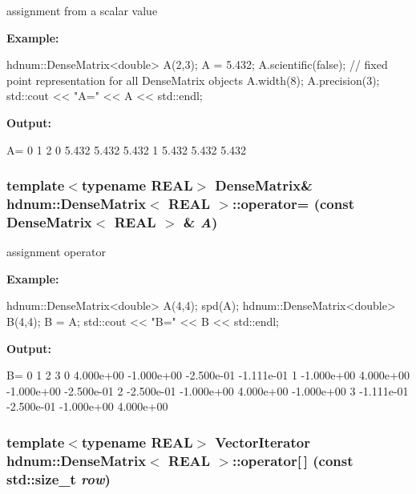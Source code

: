 assignment from a scalar value 

{\bfseries Example:} 
\begin{DoxyCode}
  hdnum::DenseMatrix<double> A(2,3);
  A = 5.432;
  A.scientific(false); // fixed point representation for all DenseMatrix objects
  A.width(8);
  A.precision(3);
  std::cout << "A=" << A << std::endl;
\end{DoxyCode}


{\bfseries Output:} \begin{DoxyVerb}
A=
                    0        1        2 
          0     5.432    5.432    5.432
          1     5.432    5.432    5.432
	  \end{DoxyVerb}
 \hypertarget{classhdnum_1_1DenseMatrix_a45a853bb1f130f7eed4590246b2b5cb5}{
\subsubsection[{operator=}]{\setlength{\rightskip}{0pt plus 5cm}template$<$typename REAL$>$ {\bf DenseMatrix}\& {\bf hdnum::DenseMatrix}$<$ REAL $>$::operator= (const {\bf DenseMatrix}$<$ REAL $>$ \& {\em A})}}
\label{classhdnum_1_1DenseMatrix_a45a853bb1f130f7eed4590246b2b5cb5}


assignment operator 

{\bfseries Example:} 
\begin{DoxyCode}
  hdnum::DenseMatrix<double> A(4,4);
  spd(A);
  hdnum::DenseMatrix<double> B(4,4);
  B = A;
  std::cout << "B=" << B << std::endl;
\end{DoxyCode}


{\bfseries Output:} \begin{DoxyVerb}
B=
                      0          1          2          3 
          0   4.000e+00 -1.000e+00 -2.500e-01 -1.111e-01 
          1  -1.000e+00  4.000e+00 -1.000e+00 -2.500e-01 
          2  -2.500e-01 -1.000e+00  4.000e+00 -1.000e+00 
          3  -1.111e-01 -2.500e-01 -1.000e+00  4.000e+00 
	  \end{DoxyVerb}
 \hypertarget{classhdnum_1_1DenseMatrix_a0b75e9b18cb4ef4eea002473d889bff8}{
\subsubsection[{operator[]}]{\setlength{\rightskip}{0pt plus 5cm}template$<$typename REAL$>$ VectorIterator {\bf hdnum::DenseMatrix}$<$ REAL $>$::operator\mbox{[}$\,$\mbox{]} (const std::size\_\-t {\em row})}}
\label{classhdnum_1_1DenseMatrix_a0b75e9b18cb4ef4eea002473d889bff8}



